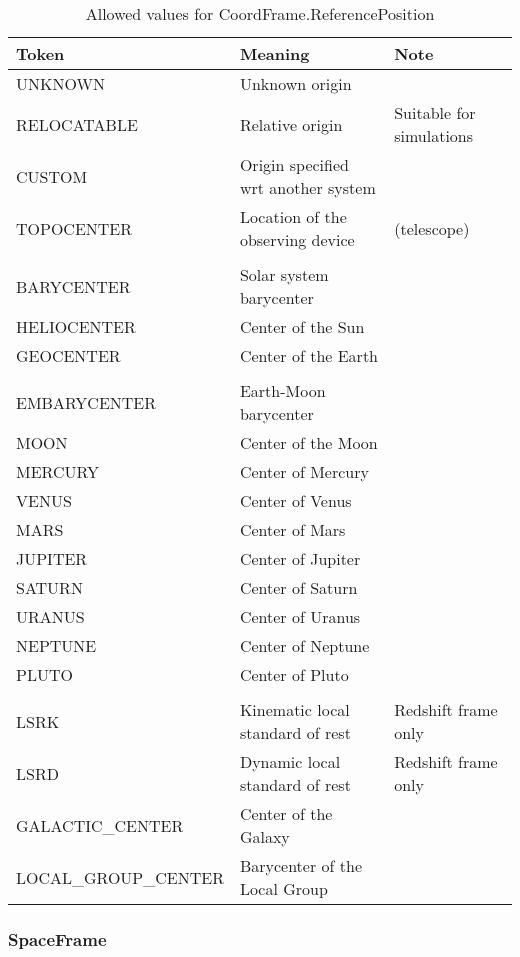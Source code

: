 \documentclass[11pt]{article}
\begin{document}
\begin{table}[h]
\small

\begin{tabular}{|lll|}
\hline
Token  &  Meaning & Note \\
\hline
UNKNOWN     &  Unknown origin&\\   %
RELOCATABLE & Relative origin& Suitable for simulations\\
CUSTOM      &  Origin specified wrt another system&\\
TOPOCENTER &  Location of the observing device &(telescope)\\
&&\\
BARYCENTER &  Solar system barycenter&\\
HELIOCENTER &  Center of the Sun&\\
GEOCENTER   &  Center of the Earth&\\
&&\\
EMBARYCENTER & Earth-Moon barycenter&\\
MOON         & Center of the Moon&\\
MERCURY      & Center of Mercury&\\
VENUS        & Center of Venus &\\
MARS & Center of Mars&\\
JUPITER& Center of Jupiter&\\
SATURN & Center of Saturn&\\
URANUS & Center of Uranus&\\
NEPTUNE & Center of Neptune&\\
PLUTO   & Center of Pluto&\\
&&\\
LSRK        & Kinematic local standard of rest& Redshift frame only\\
LSRD        & Dynamic local standard of rest& Redshift frame only\\
GALACTIC\_CENTER& Center of the Galaxy&\\
LOCAL\_GROUP\_CENTER&  Barycenter of the Local Group&\\
\hline
\end{tabular}
\caption{Allowed values for CoordFrame.ReferencePosition}

\end{table}



\subsubsection{SpaceFrame}
\end{document}
